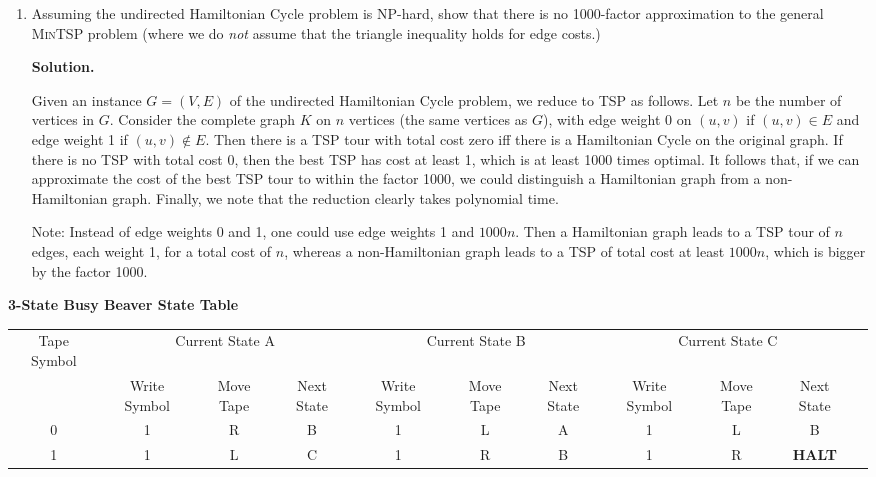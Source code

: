 \documentclass[2pt,legalpaper]{scrartcl}
\newcommand\solution{\textbf{Solution.}}
\begin{document}
\begin{multicols}{6}
\begin{enumerate}
\solution

If a tentative solution had crossed edges, we can uncross the edges
and get a better tour, as follows:

\vspace*{2in}

\item Assuming the undirected Hamiltonian Cycle problem is NP-hard,
  show that there is no 1000-factor approximation to the general
  \textsc{MinTSP} problem (where we do {\em not} assume that the
  triangle inequality holds for edge costs.)

\solution

Given an instance $G=(V,E)$ of the undirected Hamiltonian Cycle
problem, we reduce to TSP as follows.  Let $n$ be the number of
vertices in $G$.  Consider the complete graph $K$ on $n$ vertices (the
same vertices as $G$), with edge weight 0 on $(u,v)$ if $(u,v)\in E$
and edge weight 1 if $(u,v)\not\in E$.  Then there is a TSP tour with
total cost zero iff there is a Hamiltonian Cycle on the original
graph.  If there is no TSP with total cost 0, then the best TSP has
cost at least 1, which is at least 1000 times optimal.  It follows
that, if we can approximate the cost of the best TSP tour to within
the factor 1000, we could distinguish a Hamiltonian graph from a
non-Hamiltonian graph.  Finally, we note that the reduction clearly
takes polynomial time.

Note:  Instead of edge weights 0 and 1, one could use edge weights 1
and $1000n$.  Then a Hamiltonian graph leads to a TSP tour of $n$
edges, each weight 1, for a total cost of $n$, whereas a
non-Hamiltonian graph leads to a TSP of total cost at least $1000n$,
which is bigger by the factor 1000.
\end{enumerate}

  \end{multicols}


  {\bf 3-State Busy Beaver State Table}

  \begin{tabular}{|c|c|c|c|c|c|c|c|c|c|c|}
    \hline
    Tape Symbol & \multicolumn{3}{|c|}{Current State A} & \multicolumn{3}{|c|}{Current State B} & \multicolumn{3}{|c|}{Current State C} \\
                & Write Symbol & Move Tape & Next State & Write Symbol & Move Tape & Next State & Write Symbol & Move Tape & Next State\\
    \hline
    0 & 1 & R & B & 1 & L & A & 1 & L & B\\
    1 & 1 & L & C & 1 & R & B & 1 & R & {\bf HALT}\\
    \hline
  \end{tabular}
  
\end{document}
